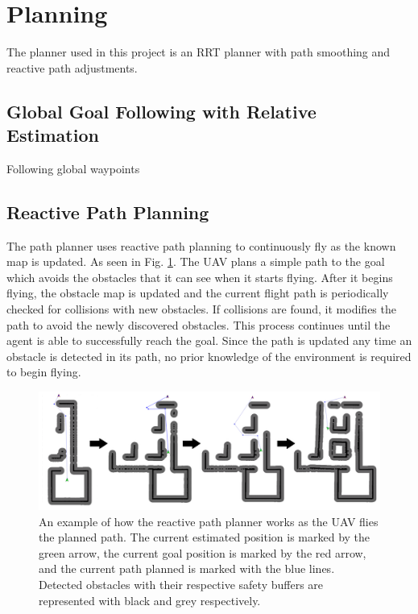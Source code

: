 \documentclass[letterpaper, 10 pt, conference]{ieeeconf}  %
\begin{document}
\section{Planning}\label{planning}

The planner used in this project is an RRT planner with path smoothing and reactive path adjustments.

\subsection{Global Goal Following with Relative Estimation}

Following global waypoints

\subsection{Reactive Path Planning}

The path planner uses reactive path planning to continuously fly as the known map is updated. As seen in Fig. \ref{fig:reactive_plan}. The UAV plans a simple path to the goal which avoids the obstacles that it can see when it starts flying. After it begins flying, the obstacle map is updated and the current flight path is periodically checked for collisions with new obstacles. If collisions are found, it modifies the path to avoid the newly discovered obstacles. This process continues until the agent is able to successfully reach the goal. Since the path is updated any time an obstacle is detected in its path, no prior knowledge of the environment is required to begin flying.

\begin{figure}
\centering
\includegraphics[width=1.0\linewidth]{adaptive_path_plan2.png}
\caption{An example of how the reactive path planner works as the UAV flies the planned path. The current estimated position is marked by the green arrow, the current goal position is marked by the red arrow, and the current path planned is marked with the blue lines. Detected obstacles with their respective safety buffers are represented with black and grey respectively.}
\label{fig:reactive_plan}
\end{figure}
\end{document}
